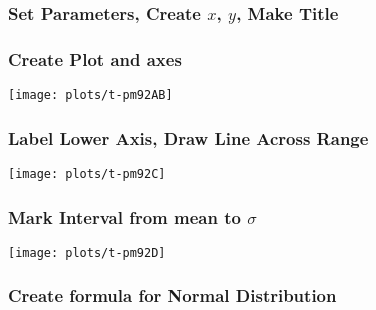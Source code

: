 \documentclass[11pt,english]{beamer}
\begin{document}

\begin{frame}
  \frametitle{Set Parameters, Create $x$, $y$, Make Title}


\end{frame}

\begin{frame}
  \frametitle{Create Plot and axes}


\end{frame}


\begin{frame}[plain]

\texttt{[image: plots/t-pm92AB]}
\end{frame}


\begin{frame}
  \frametitle{Label Lower Axis, Draw Line Across Range}


\end{frame}



\begin{frame}[plain]

\texttt{[image: plots/t-pm92C]}
\end{frame}

\begin{frame}
  \frametitle{Mark Interval from mean to $\sigma$}


\end{frame}




\begin{frame}[plain]

\texttt{[image: plots/t-pm92D]}
\end{frame}


\begin{frame}
  \frametitle{Create formula for Normal Distribution}


\end{frame}
\end{document}
